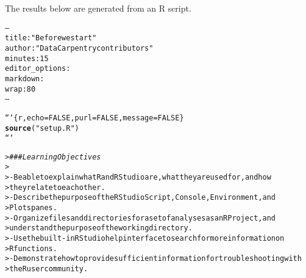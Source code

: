 \documentclass{article}\usepackage[]{graphicx}\usepackage[]{xcolor}
\makeatletter
\newcommand{\hlstr}[1]{\textcolor[rgb]{0.192,0.494,0.8}{#1}}%
\newcommand{\hlcom}[1]{\textcolor[rgb]{0.678,0.584,0.686}{\textit{#1}}}%
\newcommand{\hlkwd}[1]{\textcolor[rgb]{0.737,0.353,0.396}{\textbf{#1}}}%
\newenvironment{kframe}{%
 \def\at@end@of@kframe{}%
 \ifinner\ifhmode%
  \def\at@end@of@kframe{\end{minipage}}%
  \begin{minipage}{\columnwidth}%
 \fi\fi%
 \def\FrameCommand##1{\hskip\@totalleftmargin \hskip-\fboxsep
 \colorbox{shadecolor}{##1}\hskip-\fboxsep
     \hskip-\linewidth \hskip-\@totalleftmargin \hskip\columnwidth}%
 \MakeFramed {\advance\hsize-\width
   \@totalleftmargin\z@ \linewidth\hsize
   \@setminipage}}%
 {\par\unskip\endMakeFramed%
 \at@end@of@kframe}
\newenvironment{knitrout}{}{} %
\makeatother
\begin{document}
\title{}



\maketitle
The results below are generated from an R script.

\begin{knitrout}
\color{fgcolor}\begin{kframe}
\begin{alltt}
---
title: \hlstr{"Before we start"}
author: \hlstr{"Data Carpentry contributors"}
minutes: 15
editor_options:
  markdown:
    wrap: 80
---

```\{r, echo=FALSE, purl=FALSE, message = FALSE\}
\hlkwd{source}(\hlstr{"setup.R"})
```
\end{alltt}


{\ttfamily\noindent\bfseries\color{errorcolor}{\#\# Error: attempt to use zero-length variable name}}\end{kframe}
\end{knitrout}
\begin{knitrout}
\color{fgcolor}\begin{kframe}
\begin{alltt}

> \hlcom{### Learning Objectives}
>
> -   Be able to explain what R and RStudio are, what they are used for, and how
>     they relate to each other.
> -   Describe the purpose of the RStudio Script, Console, Environment, and
>     Plots panes.
> -   Organize files and directories for a set of analyses as an R Project, and
>     understand the purpose of the working directory.
> -   Use the built-in RStudio help interface to search for more information on
>     R functions.
> -   Demonstrate how to provide sufficient information for troubleshooting with
>     the R user community.
\end{alltt}


{\ttfamily\noindent\bfseries{}}\end{kframe}
\end{knitrout}
\end{document}
